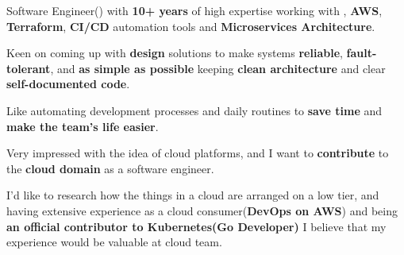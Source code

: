 \par{
    Software Engineer({\if{}\fi}) with \textbf{10+ years} of high expertise working with
        {\if{}\fi}, \textbf{AWS}, \textbf{Terraform}, \textbf{CI/CD} automation tools and \textbf{Microservices Architecture}.

    Keen on coming up with \textbf{design} solutions to make systems \textbf{reliable}, \textbf{fault-tolerant},
    and \textbf{as simple as possible} keeping \textbf{clean architecture} and clear \textbf{self-documented code}.

    Like automating development processes and daily routines to \textbf{save time} and \textbf{make the team's life easier}.

    Very impressed with the idea of cloud platforms, and I want to \textbf{contribute} to the \textbf{cloud domain} as a software engineer.

    I'd like to research how the things in a cloud are arranged on a low tier, and having extensive experience
    as a cloud consumer(\textbf{DevOps on AWS}) and being \textbf{an official contributor to Kubernetes(Go Developer)}
    I believe that my experience would be valuable at cloud team.
}